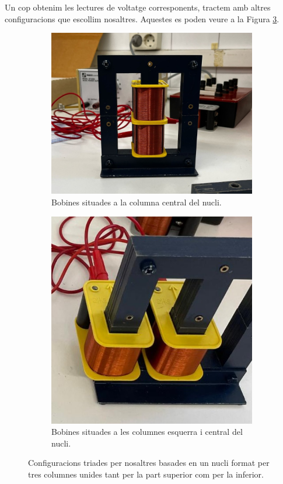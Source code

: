 \documentclass[a4paper,10.5pt]{report}
\begin{document}
Un cop obtenim les lectures de voltatge corresponents, tractem amb altres configuracions que escollim nosaltres. Aquestes es poden veure a la Figura \ref{fig4:3}.

\begin{figure}[h]
	\centering
	\begin{subfigure}[b]{0.3\textwidth}
		\centering
		\includegraphics[width=\textwidth]{inv1.jpg}
		\caption{Bobines situades a la columna central del nucli.}
		\label{fig4:3a}
	\end{subfigure}
	\hspace{2cm}
	\begin{subfigure}[b]{0.23\textwidth}
		\centering
		\includegraphics[width=\textwidth]{inv2.jpg}
		\caption{Bobines situades a les columnes esquerra i central del nucli.}
		\label{fig4:3b}
	\end{subfigure}
	\caption{Configuracions triades per nosaltres basades en un nucli format per tres columnes unides tant per la part superior com per la inferior.}
	\label{fig4:3}
\end{figure}
\end{document}
